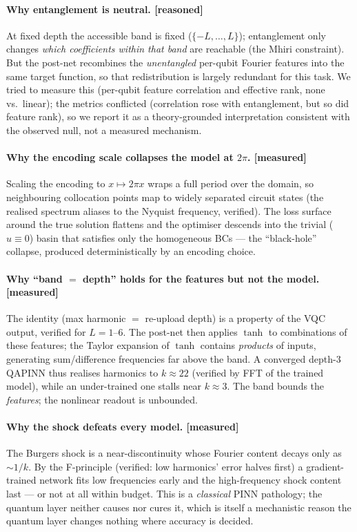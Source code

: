 \documentclass[11pt]{article}
\begin{document}
\paragraph{Why entanglement is neutral. [reasoned]} At fixed depth the accessible band
is fixed ($\{-L,\dots,L\}$); entanglement only changes \emph{which coefficients within
that band} are reachable (the Mhiri constraint). But the post-net recombines the
\emph{unentangled} per-qubit Fourier features into the same target function, so that
redistribution is largely redundant for this task. We tried to measure this
(per-qubit feature correlation and effective rank, none vs.\ linear); the metrics
conflicted (correlation rose with entanglement, but so did feature rank), so we report
it as a theory-grounded interpretation consistent with the observed null, not a
measured mechanism.

\paragraph{Why the encoding scale collapses the model at $2\pi$. [measured]} Scaling
the encoding to $x\!\mapsto\!2\pi x$ wraps a full period over the domain, so
neighbouring collocation points map to widely separated circuit states (the realised
spectrum aliases to the Nyquist frequency, verified). The loss surface around the true
solution flattens and the optimiser descends into the trivial ($u\!\equiv\!0$) basin
that satisfies only the homogeneous BCs --- the ``black-hole'' collapse, produced
deterministically by an encoding choice.

\paragraph{Why ``band $=$ depth'' holds for the features but not the model. [measured]}
The identity (max harmonic $=$ re-upload depth) is a property of the VQC output,
verified for $L=1\text{--}6$. The post-net then applies $\tanh$ to combinations of
these features; the Taylor expansion of $\tanh$ contains \emph{products} of inputs,
generating sum/difference frequencies far above the band. A converged depth-3 QAPINN
thus realises harmonics to $k\!\approx\!22$ (verified by FFT of the trained model),
while an under-trained one stalls near $k\!\approx\!3$. The band bounds the
\emph{features}; the nonlinear readout is unbounded.

\paragraph{Why the shock defeats every model. [measured]} The Burgers shock is a
near-discontinuity whose Fourier content decays only as $\sim 1/k$. By the F-principle
(verified: low harmonics' error halves first) a gradient-trained network fits low
frequencies early and the high-frequency shock content last --- or not at all within
budget. This is a \emph{classical} PINN pathology; the quantum layer neither causes nor
cures it, which is itself a mechanistic reason the quantum layer changes nothing where
accuracy is decided.
\end{document}

